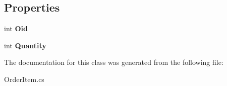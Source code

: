\subsection*{Properties}
\begin{DoxyCompactItemize}
\item 
\mbox{\label{class_nexus_1_1_order_item_a4159792c644f829452d3e44f6ffc5af4}} 
int {\bfseries Oid}
\item 
\mbox{\label{class_nexus_1_1_order_item_a4f05a5125757eb9ee6fb7394e0ef5cc0}} 
int {\bfseries Quantity}
\end{DoxyCompactItemize}


The documentation for this class was generated from the following file\+:\begin{DoxyCompactItemize}
\item 
Order\+Item.\+cs\end{DoxyCompactItemize}
